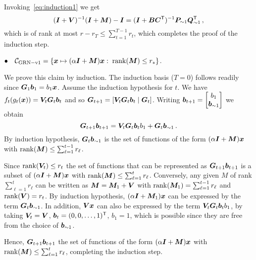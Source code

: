 Invoking~\eqref{eq:induction1} we get
\[
(\bm{I}+{\bm{V}})^{-1}(\bm{I}+{\bm{M}}) -\bm{I} =   (\bm{I}+{\bm{B}}{\bm{C}}^{\sf T})^{-1}{\bm{P}}_{\sim1}{\bm{Q}}_{\sim1}^{\sf T}\,,
\]
which is of rank at most $r-r_T\le \sum_{t=1}^{T-1}r_t$, which completes the proof of the induction step.


%
%
\bigskip

$\bullet \quad \mathcal{C}_{{\rm GRN-v1{}}} = \{\bm{x} \mapsto(\alpha\bm{I}+{\bm{M}})\bm{x}:\; \operatorname{rank}({\bm{M}})\le r_*\}$.

We prove this claim by induction. The induction basis ($T=0$) follows readily since ${\bm{G}}_1 \bm{b}_1= b_1 \bm{x}$. Assume the induction hypothesis for $t$. We have $f_t(g_t(\bm{x})) = {\bm{V}}_t {\bm{G}}_t \bm{b}_t$ and so ${\bm{G}}_{t+1} = [{\bm{V}}_t {\bm{G}}_t \bm{b}_t\;|\;  {\bm{G}}_t]$. Writing $\bm{b}_{t+1} = \begin{bmatrix}b_1\\ \bm{b}_{\sim 1}\end{bmatrix}$ we obtain
\[
{\bm{G}}_{t+1}\bm{b}_{t+1} = {\bm{V}}_t{\bm{G}}_t \bm{b}_t b_1 + {\bm{G}}_t \bm{b}_{\sim 1}\,.
\]
By induction hypothesis, ${\bm{G}}_t\bm{b}_{\sim1}$ is the set of functions of the form $(\alpha\bm{I}+{\bm{M}})\bm{x}$ with $\operatorname{rank}({\bm{M}})\le \sum_{\ell=1}^{t-1}r_\ell$. 

Since $\operatorname{rank}({\bm{V}}_t)\le r_t$ the set of functions that can be represented as ${\bm{G}}_{t+1}\bm{b}_{t+1}$ is a subset of $(\alpha\bm{I}+{\bm{M}})\bm{x}$ with $\operatorname{rank}({\bm{M}})\le \sum_{\ell=1}^t r_\ell$. Conversely, any given $M$ of rank $\sum_{\ell=1}^{t}r_\ell$ can be written as ${\bm{M}} = {\bm{M}}_1+{\bm{V}}$ with $\operatorname{rank}({\bm{M}}_1)=\sum_{\ell=1}^{t-1}r_\ell$ and $\operatorname{rank}({\bm{V}}) = r_t$. By induction hypothesis, $(\alpha\bm{I}+{\bm{M}}_1)\bm{x}$ can be expressed by the term ${\bm{G}}_t \bm{b}_{\sim1}$. In addition, ${\bm{V}}\bm{x}$ can also be expressed by the term ${\bm{V}}_t {\bm{G}}_t \bm{b}_t b_1$, by taking ${\bm{V}}_t = {\bm{V}}$, $\bm{b}_t = (0,0,\dotsc, 1)^{\sf T}$, $b_1=1$, which is possible since they are free from the choice of $\bm{b}_{\sim 1}$.

Hence, ${\bm{G}}_{t+1}\bm{b}_{t+1}$ the set of functions of the form $(\alpha\bm{I}+{\bm{M}})\bm{x}$ with $\operatorname{rank}({\bm{M}})\le \sum_{\ell=1}^t r_\ell$, completing the induction step.

\bigskip

